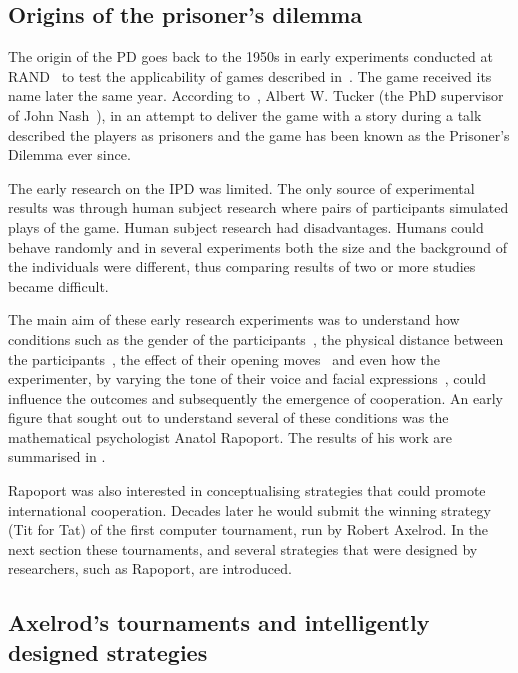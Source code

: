 \documentclass{article}
\theoremstyle{definition}
\begin{document}
\subsection{Origins of the prisoner's dilemma}\label{section:origin}

The origin of the PD goes back to the 1950s in early experiments conducted at
RAND~\cite{Flood1958} to test the applicability of games described
in~\cite{VonNeumann1944}. The game received its name later the same year.
According to~\cite{Tucker1983}, Albert W. Tucker (the PhD supervisor of John
Nash~\cite{Nash1951}), in an attempt to deliver the game with a story during a
talk described the players as prisoners and the game has been known as the
Prisoner's Dilemma ever since.

The early research on the IPD was limited. The only source of
experimental results was through human subject research where pairs of
participants simulated plays of the game. Human subject research had
disadvantages. Humans could behave randomly and in several experiments both the
size and the background of the individuals were different, thus comparing
results of two or more studies became difficult.

The main aim of these early research experiments was to understand how
conditions such as the gender of the participants~\cite{Evans1966, Lutzker1961,
Mack1971}, the physical distance between the participants~\cite{Sensenig1972}, the
effect of their opening moves~\cite{Tedeschi1968} and even how the experimenter, by varying
the tone of their voice and facial expressions~\cite{Gallo1968}, could influence
the outcomes and subsequently the emergence of cooperation. An early figure that
sought out to understand several of these conditions was the mathematical
psychologist Anatol Rapoport. The results of his work are summarised
in \cite{rapoport1965}.

Rapoport was also interested in conceptualising strategies that could promote
international cooperation. Decades later he would submit the winning strategy
(Tit for Tat) of the first computer tournament, run by Robert Axelrod.
In the next section these tournaments,
and several strategies that were designed by researchers, such as Rapoport, are
introduced.


\subsection{Axelrod's tournaments and intelligently designed strategies}
\label{subsection:intelligent_design}
\end{document}
